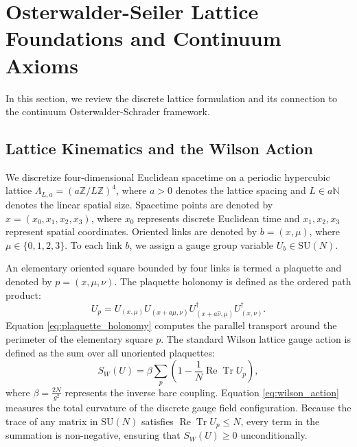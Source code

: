 \documentclass[11pt,reqno]{amsart}
\theoremstyle{plain}
\theoremstyle{definition}
\theoremstyle{remark}
\numberwithin{equation}{section}
\begin{document}
\section{Osterwalder-Seiler Lattice Foundations and Continuum Axioms}

In this section, we review the discrete lattice formulation and its connection to the continuum Osterwalder-Schrader framework.

\subsection{Lattice Kinematics and the Wilson Action}
We discretize four-dimensional Euclidean spacetime on a periodic hypercubic lattice $\Lambda_{L,a} = (a \mathbb{Z} / L \mathbb{Z})^4$, where $a > 0$ denotes the lattice spacing and $L \in a \mathbb{N}$ denotes the linear spatial size. Spacetime points are denoted by $x = (x_0, x_1, x_2, x_3)$, where $x_0$ represents discrete Euclidean time and $x_1, x_2, x_3$ represent spatial coordinates. Oriented links are denoted by $b = (x, \mu)$, where $\mu \in \{0, 1, 2, 3\}$. To each link $b$, we assign a gauge group variable $U_b \in \mathrm{SU}(N)$.

An elementary oriented square bounded by four links is termed a plaquette and denoted by $p = (x, \mu, \nu)$. The plaquette holonomy is defined as the ordered path product:
\begin{equation}
\label{eq:plaquette_holonomy}
U_p = U_{(x, \mu)} U_{(x + a\hat{\mu}, \nu)} U_{(x + a\hat{\nu}, \mu)}^\dagger U_{(x, \nu)}^\dagger.
\end{equation}
Equation \eqref{eq:plaquette_holonomy} computes the parallel transport around the perimeter of the elementary square $p$. The standard Wilson lattice gauge action is defined as the sum over all unoriented plaquettes:
\begin{equation}
\label{eq:wilson_action}
S_W(U) = \beta \sum_{p} \left( 1 - \frac{1}{N} \operatorname{Re} \operatorname{Tr} U_p \right),
\end{equation}
where $\beta = \frac{2N}{g^2}$ represents the inverse bare coupling. Equation \eqref{eq:wilson_action} measures the total curvature of the discrete gauge field configuration. Because the trace of any matrix in $\mathrm{SU}(N)$ satisfies $\operatorname{Re} \operatorname{Tr} U_p \le N$, every term in the summation is non-negative, ensuring that $S_W(U) \ge 0$ unconditionally.
\end{document}
